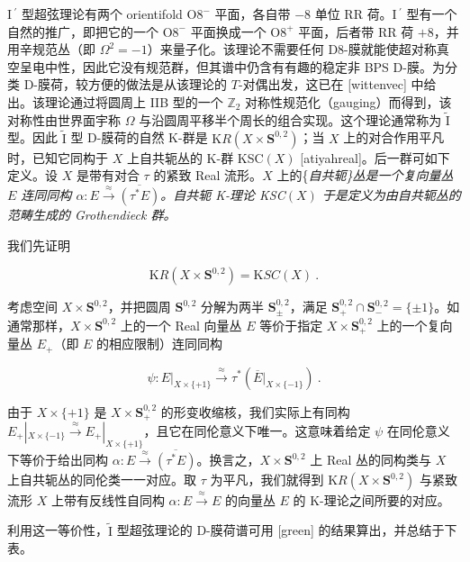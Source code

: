 \documentclass[11pt,a4paper]{ctexart}
\begin{document}
I\(\,^\prime\) 型超弦理论有两个 orientifold O\(8^-\) 平面，各自带 \(-8\) 单位 RR 荷。I\(\,^\prime\) 型有一个自然的推广，即把它的一个 O\(8^-\) 平面换成一个 O\(8^+\) 平面，后者带 RR 荷 \(+8\)，并用辛规范丛（即 \(\Omega^2=-1\)）来量子化。该理论不需要任何 D8-膜就能使超对称真空呈电中性，因此它没有规范群，但其谱中仍含有有趣的稳定非 BPS D-膜。为分类 D-膜荷，较方便的做法是从该理论的 \(T\)-对偶出发，这已在 [wittenvec] 中给出。该理论通过将圆周上 IIB 型的一个 \({\mathbb{Z}}_2\) 对称性规范化（gauging）而得到，该对称性由世界面宇称 \(\Omega\) 与沿圆周平移半个周长的组合实现。这个理论通常称为 \(\widetilde{\mathrm I}\) 型。因此 \(\widetilde{\mathrm I}\) 型 D-膜荷的自然 K-群是 \({\mathrm KR}(X\times {\mathbf S}^{0,2})\)；当 \(X\) 上的对合作用平凡时，已知它同构于 \(X\) 上自共轭丛的 K-群 KSC\((X)\) [atiyahreal]。后一群可如下定义。设 \(X\) 是带有对合 \(\tau\) 的紧致 Real 流形。\(X\) 上的\{\it 自共轭\}丛是一个复向量丛 \(E\) 连同同构 \(\alpha: E\stackrel{\approx}{\longrightarrow}\overline{(\tau^* E)}\)。自共轭 K-理论 KSC\((X)\) 于是定义为由自共轭丛的范畴生成的 Grothendieck 群。

我们先证明

\[{\mathrm KR}(X\times {\mathbf S}^{0,2})={\mathrm KSC}(X) \ .\]

考虑空间 \(X\times{\mathbf S}^{0,2}\)，并把圆周 \({\mathbf S}^{0,2}\) 分解为两半 \({\mathbf S}^{0,2}_{\pm}\)，满足 \({\mathbf S}^{0,2}_+\cap{\mathbf S}^{0,2}_-=\{\pm 1\}\)。如通常那样，\(X\times{\mathbf S}^{0,2}\) 上的一个 Real 向量丛 \(E\) 等价于指定 \(X\times{\mathbf S}^{0,2}_+\) 上的一个复向量丛 \(E_+\)（即 \(E\) 的相应限制）连同同构

\[\psi: E|_{X\times\{ +1\}}\stackrel{\approx}{\longrightarrow}
\tau^*(\overline{E}|_{X\times\{ -1\}}) \ .\]

由于 \(X\times\{ +1\}\) 是 \(X\times{\mathbf S}^{0,2}_+\) 的形变收缩核，我们实际上有同构 \(E_+|_{X\times\{ -1\}}\stackrel{\approx}{\longrightarrow}E_+|_{X\times\{ +1\}}\)，且它在同伦意义下唯一。这意味着给定 \(\psi\) 在同伦意义下等价于给出同构 \(\alpha: E\stackrel{\approx}{\longrightarrow}\overline{(\tau^* E)}\)。换言之，\(X\times{\mathbf S}^{0,2}\) 上 Real 丛的同构类与 \(X\) 上自共轭丛的同伦类一一对应。取 \(\tau\) 为平凡，我们就得到 \({\mathrm KR}(X\times{\mathbf S}^{0,2})\) 与紧致流形 \(X\) 上带有反线性自同构 \(\alpha:E\stackrel{\approx}{\longrightarrow}E\) 的向量丛 \(E\) 的 K-理论之间所要的对应。

利用这一等价性，\(\widetilde{\mathrm I}\) 型超弦理论的 D-膜荷谱可用 [green] 的结果算出，并总结于下表。
\end{document}
